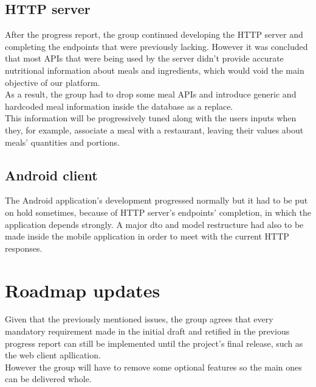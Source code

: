     \subsection{HTTP server}

    After the progress report, the group continued developing the HTTP server and completing the endpoints that were previously lacking. However
    it was concluded that most APIs that were being used by the server didn't provide accurate nutritional information about meals and ingredients,
    which would void the main objective of our platform.\\

    As a result, the group had to drop some meal APIs and introduce generic and hardcoded meal information inside the database as a replace.\\

    This information will be progressively tuned along with the users inputs when they, for example, associate a meal with a restaurant, leaving
    their values about meals' quantities and portions.

    \subsection{Android client}

    The Android application's development progressed normally but it had to be put on hold sometimes, because of HTTP server's endpoints' completion, in which the application
    depends strongly. A major dto and model restructure had also to be made inside the mobile application in order to meet with the current HTTP responses.\\

    \section{Roadmap updates}

    Given that the previously mentioned issues, the group agrees that every mandatory requirement made in the initial draft
    and retified in the previous progress report can still be implemented until the project's final release, such as the web client apllication.\\
    
    However the group will have to remove some optional features so the main ones can be delivered whole.